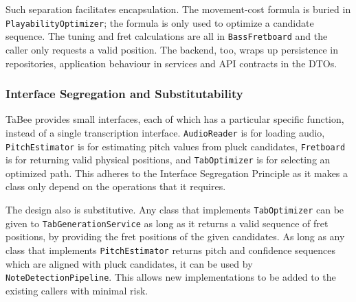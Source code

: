 \documentclass[a4paper, 12pt, titlepage]{article}
\begin{document}
Such separation facilitates encapsulation. The movement-cost formula is buried in \texttt{PlayabilityOptimizer}; the formula is only used to optimize a candidate sequence. The tuning and fret calculations are all in \texttt{BassFretboard} and the caller only requests a valid position. The backend, too, wraps up persistence in repositories, application behaviour in services and API contracts in the DTOs.

\subsubsection{Interface Segregation and Substitutability}

TaBee provides small interfaces, each of which has a particular specific function, instead of a single transcription interface. \texttt{AudioReader} is for loading audio, \texttt{PitchEstimator} is for estimating pitch values from pluck candidates, \texttt{Fretboard} is for returning valid physical positions, and \texttt{TabOptimizer} is for selecting an optimized path. This adheres to the Interface Segregation Principle as it makes a class only depend on the operations that it requires.

The design also is substitutive. Any class that implements \texttt{TabOptimizer} can be given to \texttt{TabGenerationService} as long as it returns a valid sequence of fret positions, by providing the fret positions of the given candidates. As long as any class that implements \texttt{PitchEstimator} returns pitch and confidence sequences which are aligned with pluck candidates, it can be used by \texttt{NoteDetectionPipeline}. This allows new implementations to be added to the existing callers with minimal risk.
\end{document}
